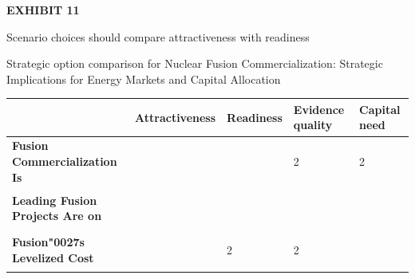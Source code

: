 \documentclass[10pt,a4paper]{article}
\newcommand{\BOApos}{{\BOQuoteFont\char"0027}}
\begin{document}
\clearpage
{\textcolor{BOGreen}{\scriptsize\bfseries EXHIBIT 11}}\par\vspace{3pt}
{\sffamily\fontsize{15}{19}\selectfont\color{BONavy} Scenario choices should compare attractiveness with readiness}\par
{\small\color{BOText} Strategic option comparison for Nuclear Fusion Commercialization: Strategic Implications for Energy Markets and Capital Allocation}\par\vspace{4pt}
{\scriptsize\begin{tabular}{p{38mm}>{\centering\arraybackslash}p{21mm}>{\centering\arraybackslash}p{21mm}>{\centering\arraybackslash}p{21mm}>{\centering\arraybackslash}p{21mm}}
 & {\bfseries Attractiveness} & {\bfseries Readiness} & {\bfseries Evidence quality} & {\bfseries Capital need} \\
\hline
{\bfseries Fusion Commercialization Is} & \colorbox{BOGreen}{\textcolor{white}{\strut\hspace{5pt}5\hspace{5pt}}} & \colorbox{BOBlue}{\textcolor{white}{\strut\hspace{5pt}3\hspace{5pt}}} & \colorbox{BOLight}{\textcolor{BOText}{\strut\hspace{5pt}2\hspace{5pt}}} & \colorbox{BOLight}{\textcolor{BOText}{\strut\hspace{5pt}2\hspace{5pt}}} \\
{\bfseries Leading Fusion Projects Are on} & \colorbox{BOGreen}{\textcolor{white}{\strut\hspace{5pt}4\hspace{5pt}}} & \colorbox{BOGreen}{\textcolor{white}{\strut\hspace{5pt}4\hspace{5pt}}} & \colorbox{BOBlue}{\textcolor{white}{\strut\hspace{5pt}3\hspace{5pt}}} & \colorbox{BOBlue}{\textcolor{white}{\strut\hspace{5pt}3\hspace{5pt}}} \\
{\bfseries Fusion\BOApos{}s Levelized Cost} & \colorbox{BOGreen}{\textcolor{white}{\strut\hspace{5pt}4\hspace{5pt}}} & \colorbox{BOLight}{\textcolor{BOText}{\strut\hspace{5pt}2\hspace{5pt}}} & \colorbox{BOLight}{\textcolor{BOText}{\strut\hspace{5pt}2\hspace{5pt}}} & \colorbox{BOGreen}{\textcolor{white}{\strut\hspace{5pt}4\hspace{5pt}}} \\

\end{tabular}}
\end{document}
